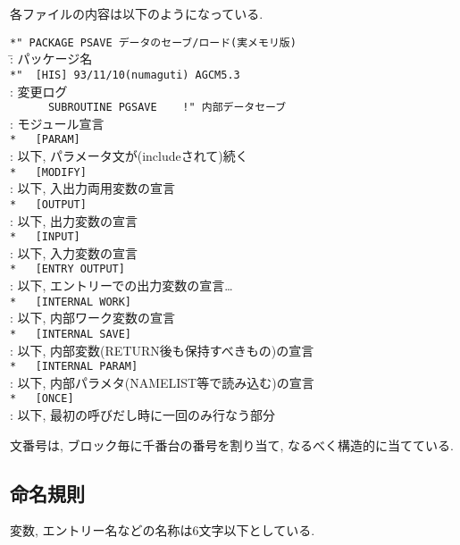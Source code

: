 \・各ファイルの内容は以下のようになっている. 
\begin{tabbing}
\verb+*" PACKAGE PSAVE データのセーブ/ロード(実メモリ版) + \\
\hspace*{15mm}  \=  : パッケージ名      \\
\verb+*"  [HIS] 93/11/10(numaguti) AGCM5.3+ \\
                \>  : 変更ログ \\
\verb+      SUBROUTINE PGSAVE    !" 内部データセーブ+ \\
                \>  : モジュール宣言 \\
\verb+*   [PARAM]+ \\
                \>  : 以下, パラメータ文が(includeされて)続く \\
\verb+*   [MODIFY] + \\
                \>  : 以下, 入出力両用変数の宣言 \\
\verb+*   [OUTPUT] + \\
                \>  : 以下, 出力変数の宣言 \\
\verb+*   [INPUT] + \\
                \>  : 以下, 入力変数の宣言 \\
\verb+*   [ENTRY OUTPUT] + \\
                \>  : 以下, エントリーでの出力変数の宣言\ldots \\
\verb+*   [INTERNAL WORK] + \\
                \>  : 以下, 内部ワーク変数の宣言 \\
\verb+*   [INTERNAL SAVE]+ \\
                \>  : 以下, 内部変数(RETURN後も保持すべきもの)の宣言\\
\verb+*   [INTERNAL PARAM]+ \\
                \>  : 以下, 内部パラメタ(NAMELIST等で読み込む)の宣言\\
\verb+*   [ONCE]+ \\
                \>  : 以下, 最初の呼びだし時に一回のみ行なう部分 \\
\end{tabbing}

\・文番号は, ブロック毎に千番台の番号を割り当て,
  なるべく構造的に当てている.

\subsection{命名規則}

\・変数, エントリー名などの名称は6文字以下としている.

